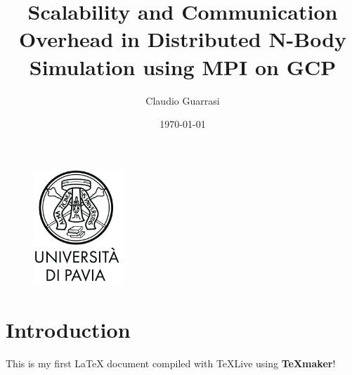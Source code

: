 \documentclass{article}
\title{Scalability and Communication Overhead in Distributed N-Body Simulation using MPI on GCP}
\author{Claudio Guarrasi}
\date{\today}
\begin{document}
\begin{figure}[!t]
    \centering
    \vspace*{-3cm}
    \includegraphics[width=0.3\textwidth]{black_unipv_logo_caption_below.png}\vspace*{-1.6cm}
\end{figure}



\maketitle

\section{Introduction}

This is my first LaTeX document compiled with \TeX Live{} using \textbf{TeXmaker}!
\end{document}
